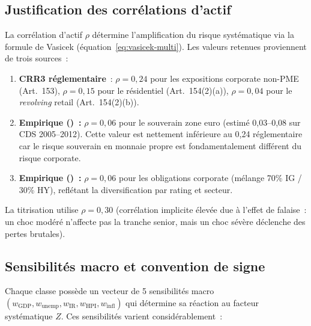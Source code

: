\documentclass[12pt, a4paper, twoside, openright]{report}
\theoremstyle{definition}
\begin{document}
\subsection{Justification des corrélations d'actif}

La corrélation d'actif $\rho$ détermine l'amplification du risque systématique via la formule de Vasicek (équation~\ref{eq:vasicek-multi}). Les valeurs retenues proviennent de trois sources~:

\begin{enumerate}
\item \textbf{CRR3 réglementaire}~: $\rho = 0{,}24$ pour les expositions corporate non-PME (Art.~153), $\rho = 0{,}15$ pour le résidentiel (Art.~154(2)(a)), $\rho = 0{,}04$ pour le \textit{revolving} retail (Art.~154(2)(b)).
\item \textbf{Empirique (\citealt{longstaff2011})~:} $\rho = 0{,}06$ pour le souverain zone euro (estimé 0,03--0,08 sur CDS 2005--2012). Cette valeur est nettement inférieure au 0,24 réglementaire car le risque souverain en monnaie propre est fondamentalement différent du risque corporate.
\item \textbf{Empirique (\citealt{de-servigny2002})~:} $\rho = 0{,}06$ pour les obligations corporate (mélange 70\% IG / 30\% HY), reflétant la diversification par rating et secteur.
\end{enumerate}

La titrisation utilise $\rho = 0{,}30$ (corrélation implicite élevée due à l'effet de falaise~: un choc modéré n'affecte pas la tranche senior, mais un choc sévère déclenche des pertes brutales).

\subsection{Sensibilités macro et convention de signe}

Chaque classe possède un vecteur de 5 sensibilités macro $(w_{\text{GDP}}, w_{\text{unemp}}, w_{\text{IR}}, w_{\text{HPI}}, w_{\text{infl}})$ qui détermine sa réaction au facteur systématique $Z$. Ces sensibilités varient considérablement~:
\end{document}
